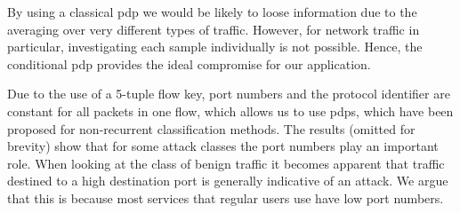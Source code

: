 \documentclass[conference]{IEEEtran}
\newcommand\note[2]{{\color{#1}#2}}
\newcommand\todo[1]{{\note{red}{TODO: #1}}}
\begin{document}
By using a classical \gls{pdp} we would be likely to loose information due to the averaging over very different types of traffic. However, for network traffic in particular, investigating each sample individually is not possible. Hence, the conditional \gls{pdp} provides the ideal compromise for our application.

%
%
%

Due to the use of a 5-tuple flow key, port numbers and the protocol identifier are constant for all packets in one flow, which allows us to use \glspl{pdp}, which have been proposed for non-recurrent classification methods.
The results (omitted for brevity) show that for some attack classes the port numbers play an important role. When looking at the class of benign traffic %
it becomes apparent that traffic destined to a high destination port is generally indicative of an attack. We argue that this is because most services that regular users use have low port numbers.


\end{document}
